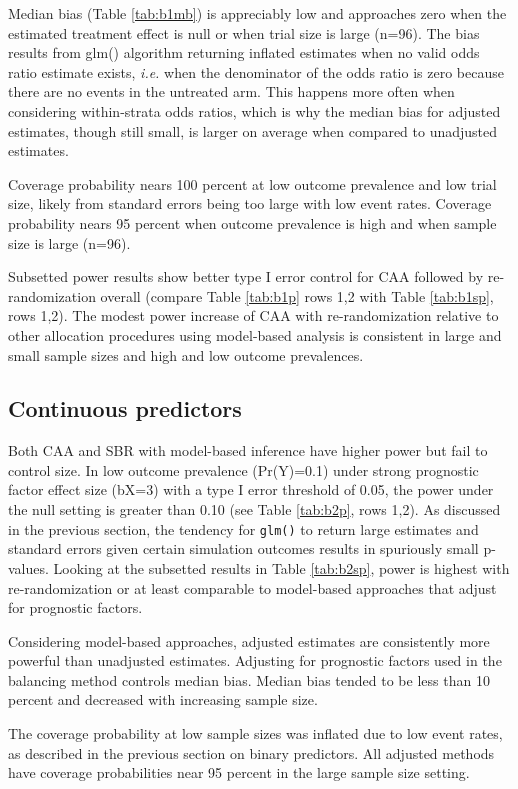 Median bias (Table \ref{tab:b1mb}) is appreciably low and approaches zero when the estimated treatment effect is null or when trial size is large (n=96).
The bias results from glm() algorithm returning inflated estimates when no valid odds ratio estimate exists, \textit{i.e.} when the denominator of the odds ratio is zero because there are no events in the untreated arm.
This happens more often when considering within-strata odds ratios, which is why the median bias for adjusted estimates, though still small, is larger on average when compared to unadjusted estimates.

Coverage probability nears 100 percent at low outcome prevalence and low trial size, likely from standard errors being too large with low event rates.
Coverage probability nears 95 percent when outcome prevalence is high and when sample size is large (n=96).

Subsetted power results show better type I error control for CAA followed by re-randomization overall (compare Table \ref{tab:b1p} rows 1,2 with Table \ref{tab:b1sp}, rows 1,2).
The modest power increase of CAA with re-randomization relative to other allocation procedures using model-based analysis is consistent in large and small sample sizes and high and low outcome prevalences.


\subsection{Continuous predictors}
Both CAA and SBR with model-based inference have higher power but fail to control size.
In low outcome prevalence (Pr(Y)=0.1) under strong prognostic factor effect size (bX=3) with a type I error threshold of 0.05, the power under the null setting is greater than 0.10 (see Table \ref{tab:b2p}, rows 1,2). 
As discussed in the previous section, the tendency for \texttt{glm()} to return large estimates and standard errors given certain simulation outcomes results in spuriously small p-values. 
Looking at the subsetted results in Table \ref{tab:b2sp}, power is highest with re-randomization or at least comparable to model-based approaches that adjust for prognostic factors.

Considering model-based approaches, adjusted estimates are consistently more powerful than unadjusted estimates. 
Adjusting for prognostic factors used in the balancing method controls median bias.
Median bias tended to be less than 10 percent and decreased with increasing sample size.

The coverage probability at low sample sizes was inflated due to low event rates, as described in the previous section on binary predictors.
All adjusted methods have coverage probabilities near 95 percent in the large sample size setting. 

